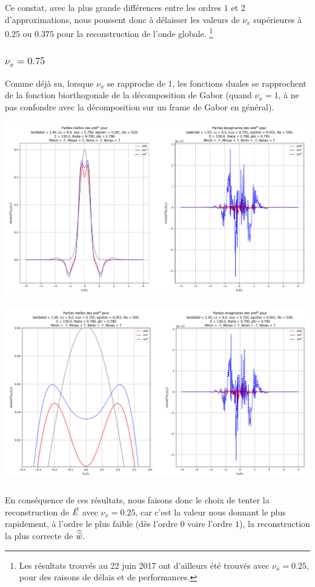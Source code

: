 Ce constat, avec la plus grande différences entre les ordres $1$ et $2$ d'approximations, nous poussent donc à délaisser
les valeurs de $\nu_x$ supérieures à $0.25$ ou $0.375$ pour la reconstruction de l'onde globale.
\footnote{Les résultats trouvés au 22 juin 2017 ont d'ailleurs été trouvés avec
$\nu_x=0.25$, pour des raisons de délais et de performances.}

\newpage

\subsubsection{$\nu_x = 0.75$}

Comme déjà su, lorsque $\nu_x$ se rapproche de 1, les fonctions duales se rapprochent de la fonction biorthogonale
de la décomposition de Gabor (quand $\nu_x=1$, à ne pas confondre avec la décomposition sur un frame de Gabor en général).

\includegraphics[scale=0.4]{4.png}

\includegraphics[scale=0.4]{4-1.png}


\subparagraph{}

En conséquence de ces résultats, nous faisons donc le choix de tenter la reconstruction de ${\vec{E}}$ avec $\nu_x=0.25$,
car c'est la valeur nous donnant le plus rapidement, à l'ordre le plus faible (dès l'ordre $0$ voire l'ordre $1$),
la reconstruction la plus correcte de $\widehat{\widetilde{w}}$.

